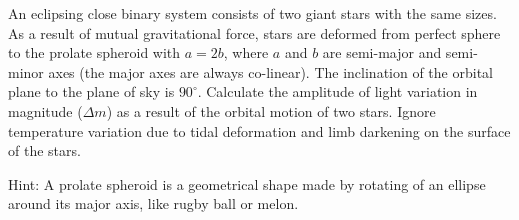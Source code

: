 An eclipsing close binary system consists of two giant stars with the same
sizes. As a result of mutual gravitational force, stars are deformed from
perfect sphere to the prolate spheroid with $a = 2b$, where $a$ and $b$ are
semi-major and semi-minor axes (the major axes are always co-linear). The
inclination of the orbital plane to the plane of sky is $90^\circ$. Calculate
the amplitude of light variation in magnitude ($\Delta m$) as a result of the
orbital motion of two stars. Ignore temperature variation due to tidal
deformation and limb darkening on the surface of the stars.

Hint: A prolate spheroid is a geometrical shape made by rotating of an
ellipse around its major axis, like rugby ball or melon.
